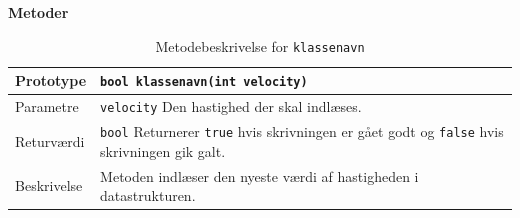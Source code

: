 \textbf{Metoder}
\begin{table}[h]
\begin{tabularx}{\textwidth}{| L{2.5 cm} | Z |} \hline
Prototype & \texttt{bool klassenavn(int velocity)} \\\hline
Parametre & \texttt{velocity} \newline Den hastighed der skal indlæses. \\\hline
Returværdi &  \texttt{bool} \newline Returnerer \texttt{true} hvis skrivningen er gået godt og \texttt{false} hvis skrivningen gik galt. \\\hline
Beskrivelse & Metoden indlæser den nyeste værdi af hastigheden i datastrukturen. \\\hline
\end{tabularx}
\caption{Metodebeskrivelse for \texttt{klassenavn}}
\label{table:met_klassenavn}
\end{table}

